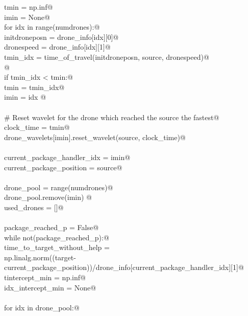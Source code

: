 \documentclass[12.0pt]{report}
\begin{document}
\begin{flushleft}
\begin{list}{}{}
\mbox{}\verb@    tmin = np.inf@\\
\mbox{}\verb@    imin = None@\\
\mbox{}\verb@    for idx in range(numdrones):@\\
\mbox{}\verb@         initdroneposn = drone_info[idx][0]@\\
\mbox{}\verb@         dronespeed    = drone_info[idx][1]@\\
\mbox{}\verb@         tmin_idx = time_of_travel(initdroneposn, source, dronespeed)@\\
\mbox{}\verb@    @\\
\mbox{}\verb@         if tmin_idx < tmin:@\\
\mbox{}\verb@             tmin = tmin_idx@\\
\mbox{}\verb@             imin = idx @\\
\mbox{}\verb@@\\
\mbox{}\verb@    # Reset wavelet for the drone which reached the source the fastest@\\
\mbox{}\verb@    clock_time = tmin@\\
\mbox{}\verb@    drone_wavelets[imin].reset_wavelet(source, clock_time)@\\
\mbox{}\verb@@\\
\mbox{}\verb@    current_package_handler_idx = imin@\\
\mbox{}\verb@    current_package_position = source@\\
\mbox{}\verb@@\\
\mbox{}\verb@    drone_pool = range(numdrones)@\\
\mbox{}\verb@    drone_pool.remove(imin) @\\
\mbox{}\verb@    used_drones = []@\\
\mbox{}\verb@@\\
\mbox{}\verb@    package_reached_p   = False@\\
\mbox{}\verb@    while not(package_reached_p):@\\
\mbox{}\verb@          time_to_target_without_help =\@\\
\mbox{}\verb@              np.linalg.norm((target-current_package_position))/drone_info[current_package_handler_idx][1]@\\
\mbox{}\verb@          tintercept_min     = np.inf@\\
\mbox{}\verb@          idx_intercept_min  = None@\\
\mbox{}\verb@@\\
\mbox{}\verb@          for idx in drone_pool:@\\

\end{list}
\end{flushleft}
\end{document}
